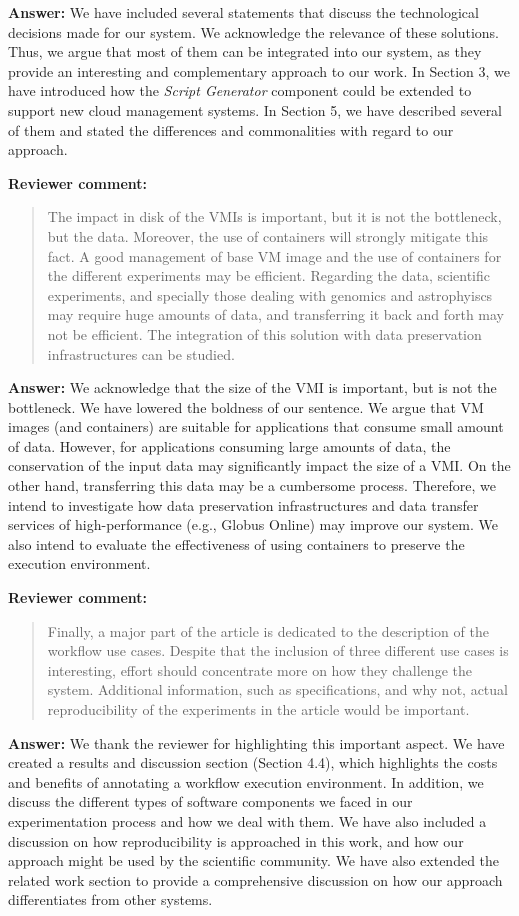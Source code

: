 \documentclass{letter}
\newenvironment{review}%
{\textbf{Reviewer comment:}\begin{quote}}%
{\end{quote}}%
\newcommand{\answer}[1]{%
      \textbf{Answer:} #1}
\begin{document}
\begin{letter}{}
\answer{We have included several statements that discuss the technological decisions made for our system. We acknowledge the relevance of these solutions. Thus, we argue that most of them can be integrated into our system, as they provide an interesting and complementary approach to our work. In Section 3, we have introduced how the {\it Script Generator} component could be extended to support new cloud management systems. In Section 5, we have described several of them and stated the differences and commonalities with regard to our approach.}


\begin{review}
The impact in disk of the VMIs is important, but it is not the bottleneck, but the data. Moreover, the use of containers will strongly mitigate this fact. A good management of base VM image and the use of containers for the different experiments may be efficient. Regarding the data, scientific experiments, and specially those dealing with genomics and astrophyiscs may require huge amounts of data, and transferring it back and forth may not be efficient. The integration of this solution with data preservation infrastructures can be studied.
\end{review}

\answer{We acknowledge that the size of the VMI is important, but is not the bottleneck. We have lowered the boldness of our sentence. We argue that VM images (and containers) are suitable for applications that consume small amount of data. However, for applications consuming large amounts of data, the conservation of the input data may significantly impact the size of a VMI. On the other hand, transferring this data may be a cumbersome process. Therefore, we intend to investigate how data preservation infrastructures and data transfer services of high-performance (e.g., Globus Online) may improve our system. We also intend to evaluate the effectiveness of using containers to preserve the execution environment.}


\begin{review}
Finally, a major part of the article is dedicated to the description of the workflow use cases. Despite that the inclusion of three different use cases is interesting, effort should concentrate more on how they challenge the system. Additional information, such as specifications, and why not, actual reproducibility of the experiments in the article would be important.
\end{review}

\answer{We thank the reviewer for highlighting this important aspect. We have created a results and discussion section (Section 4.4), which highlights the costs and benefits of annotating a workflow execution environment. In addition, we discuss the different types of software components we faced in our experimentation process and how we deal with them. We have also included a discussion on how reproducibility is approached in this work, and how our approach might be used by the scientific community. We have also extended the related work section to provide a comprehensive discussion on how our approach differentiates from other systems.}


\end{letter}
\end{document}
